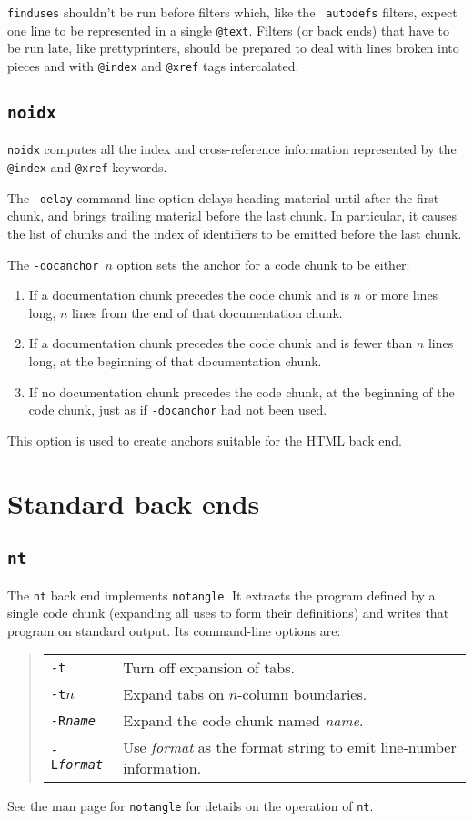 \documentclass{article}
\makeatletter
\newcommand\kw[1]{\texttt{@#1}}
\makeatother
\begin{document}
{\tt finduses} shouldn't be run before filters which, like the {\tt
autodefs} filters, expect one line to be represented in a single
\kw{text}.
Filters (or back ends) that have to be run late, like 
prettyprinters, should be prepared to deal with lines broken into
pieces and with \kw{index} and \kw{xref} tags intercalated.

\subsection{\tt noidx}

{\tt noidx} computes all the index and cross-reference information
represented by the \kw{index} and \kw{xref} keywords.

The {\tt -delay} command-line option delays heading material until
after the first chunk, and brings trailing material before the last
chunk.
In particular, it causes
the list of chunks and the index of identifiers to be emitted before
the last chunk.

The {\tt -docanchor $n$} option sets the anchor for a code chunk to be
either:
\begin{enumerate}
\item
If a documentation chunk precedes the code chunk and is $n$ or more lines long, $n$
lines from the end of that documentation chunk.
\item
If a documentation chunk precedes the code chunk and is fewer than $n$
lines long, at the beginning of that documentation chunk.
\item
If no documentation chunk precedes the code chunk, at the beginning of
the code chunk, just as if {\tt -docanchor} had not been used.
\end{enumerate}
This option is used to create anchors suitable for the HTML back end.


\section{Standard back ends}

\subsection{\tt nt}

The {\tt nt} back end implements {\tt notangle}.
It extracts the program defined by a single code chunk (expanding all
uses to form their definitions) and writes that program on standard
output.
Its command-line options are:
\begin{quote}
\begin{tabularx}{\linewidth}{lX}
\tt -t&Turn off expansion of tabs.\\
\tt -t$n$&Expand tabs on $n$-column boundaries.\\
\tt -R{\rmfamily\textit{name}}&Expand the code chunk named \textit{name}.\\
\tt -L{\rmfamily\textit{format}}&Use \textit{format} as the format string
        to emit line-number information.
\end{tabularx}
\end{quote}
See the man page for {\tt notangle} for details on the operation of
{\tt nt}.
\end{document}
